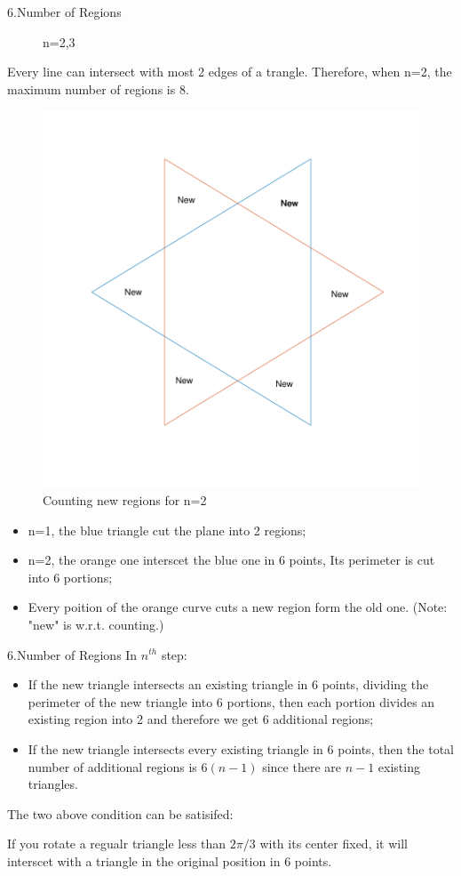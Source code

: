 \documentclass{beamer}
\begin{document}
\begin{frame}{6.Number of Regions}
\begin{figure}
\caption{n=2,3}
\end{figure}
Every line can intersect with most 2 edges of a trangle. Therefore, when n=2, the maximum number of regions is 8.
\framebreak
	\begin{figure}
		\includegraphics[width=0.5\textheight]{21.pdf}
		\caption{Counting new regions for n=2}
	\end{figure}
{ \begin{itemize}
	\item n=1, the blue triangle cut the plane into 2 regions;
	\item n=2, the orange one interscet the blue one in 6 points, Its perimeter is cut into 6 portions;
	\item Every poition of the orange curve cuts a new region form the old one. (Note: "new" is w.r.t. counting.)
\end{itemize} }
\end{frame}
\begin{frame}{6.Number of Regions}
	In $ n^{th} $ step:
	\begin{itemize}
		\item 	If the new triangle intersects an existing triangle in 6
		points, dividing the perimeter of the new triangle into 6 portions, then each portion divides an
		existing region into 2 and therefore we get 6 additional regions;
		\item  If the new triangle intersects every existing triangle in 6
		points, then the total number
		of additional regions is $ 6(n − 1) $ since there are $ n − 1 $ existing triangles.
	\end{itemize}


 The two above condition can be satisifed:
 
  If you rotate a regualr triangle less than $ 2\pi/3 $ with its center fixed, it will interscet with a triangle in the original position in 6 points.
\end{frame}
\end{document}
